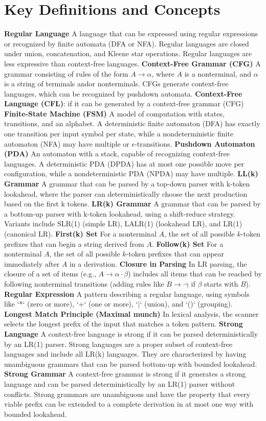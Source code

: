 
\section{Key Definitions and Concepts}
\textbf{Regular Language} A language that can be expressed using regular expressions or recognized by finite automata (DFA or NFA). Regular languages are closed under union, concatenation, and Kleene star operations.  Regular languages are less expressive than context-free languages.
\textbf{Context-Free Grammar (CFG)} A grammar consisting of rules of the form $A \rightarrow \alpha $, where $A$ is a nonterminal, and $\alpha $ is a string of terminals and\/or nonterminals. CFGs generate context-free languages, which can be recognized by pushdown automata.
\textbf{Context-Free Language (CFL)}: if it can be generated by a context-free grammar (CFG)
\textbf{Finite-State Machine (FSM)} A model of computation with states, transitions, and an alphabet. A deterministic finite automaton (DFA) has exactly one transition per input symbol per state, while a nondeterministic finite automaton (NFA) may have multiple or $\epsilon$-transitions.
\textbf{Pushdown Automaton (PDA)} An automaton with a stack, capable of recognizing context-free languages. A deterministic PDA (DPDA) has at most one possible move per configuration, while a nondeterministic PDA (NPDA) may have multiple.
\textbf{LL(k) Grammar} A grammar that can be parsed by a top-down parser with k-token lookahead, where the parser can deterministically choose the next production based on the first k tokens.
\textbf{LR(k) Grammar} A grammar that can be parsed by a bottom-up parser with k-token lookahead, using a shift-reduce strategy. Variants include SLR(1) (simple LR), LALR(1) (lookahead LR), and LR(1) (canonical LR).
\textbf{First(k) Set} For a nonterminal $A$, the set of all possible $k$-token prefixes that can begin a string derived from $A$.
\textbf{Follow(k) Set} For a nonterminal $A$, the set of all possible $k$-token prefixes that can appear immediately after $A$ in a derivation.
\textbf{Closure in Parsing} In LR parsing, the closure of a set of items (e.g., $A \rightarrow \alpha \cdot \beta $) includes all items that can be reached by following nonterminal transitions (adding rules like $B \rightarrow \cdot \gamma$ if $\beta $ starts with $B$).
\textbf{Regular Expression} A pattern describing a regular language, using symbols like `*` (zero or more), `+` (one or more), `$\vert$` (union), and `()` (grouping).
\textbf{Longest Match Principle (Maximal munch)} In lexical analysis, the scanner selects the longest prefix of the input that matches a token pattern.
\textbf{Strong Language} A context-free language is strong if it can be parsed deterministically by an LR(1) parser. Strong languages are a proper subset of context-free languages and include all LR(k) languages. They are characterized by having unambiguous grammars that can be parsed bottom-up with bounded lookahead.
\textbf{Strong Grammar} A context-free grammar is strong if it generates a strong language and can be parsed deterministically by an LR(1) parser without conflicts. Strong grammars are unambiguous and have the property that every viable prefix can be extended to a complete derivation in at most one way with bounded lookahead.

